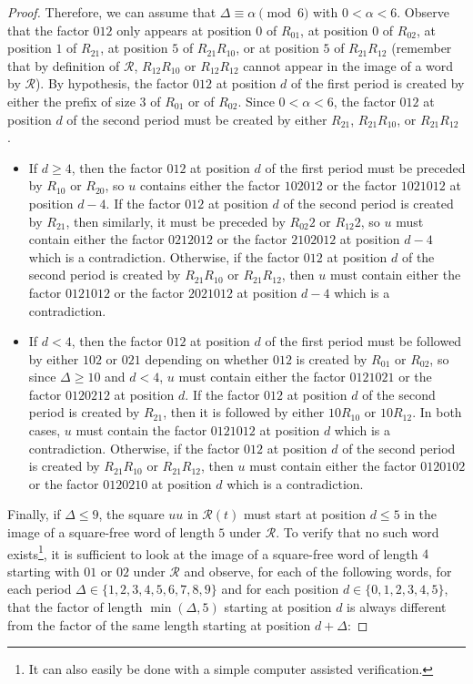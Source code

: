 \documentclass[10pt,a4paper]{amsart}
\begin{document}
\begin{proof}
    Therefore, we can assume that $\Delta \equiv \alpha\pmod6$ with $0 < \alpha < 6$. 
    Observe that the factor $012$ only appears at position $0$ of $R_{01}$, at position $0$ of $R_{02}$, at position $1$ of $R_{21}$, at position $5$ of $R_{21}R_{10}$, or at position $5$ of $R_{21}R_{12}$ (remember that by definition of $\mathcal{R}$, $R_{12}R_{10}$ or $R_{12}R_{12}$ cannot appear in the image of a word by $\mathcal{R}$). By hypothesis, the factor $012$ at position $d$ of the first period is created by either the prefix of size $3$ of $R_{01}$ or of $R_{02}$. Since $0 < \alpha < 6$, the factor $012$ at position $d$ of the second period must be created by either $R_{21}$, $R_{21}R_{10}$, or $R_{21}R_{12}$ . 
    \begin{itemize}
        \item If $d \geq 4$, then the factor $012$ at position $d$ of the first period must be preceded by $R_{10}$ or $R_{20}$, so $u$ contains either the factor $102012$ or the factor $1021012$ at position $d - 4$. If the factor $012$ at position $d$ of the second period is created by $R_{21}$, then similarly, it must be preceded by $R_{02}2$ or $R_{12}2$, so $u$ must contain either the factor $0212012$ or the factor $2102012$ at position $d - 4$ which is a contradiction. Otherwise, if the factor $012$ at position $d$ of the second period is created by $R_{21}R_{10}$ or $R_{21}R_{12}$, then $u$ must contain either the factor $0121012$ or the factor $2021012$ at position $d - 4$ which is a contradiction.
        \item If $d < 4$, then the factor $012$ at position $d$ of the first period must be followed by either $102$ or $021$ depending on whether $012$ is created by $R_{01}$ or $R_{02}$, so since $\Delta \geq 10$ and $d < 4$, $u$ must contain either the factor $0121021$ or the factor $0120212$ at position $d$. If the factor $012$ at position $d$ of the second period is created by $R_{21}$, then it is followed by either $10R_{10}$ or $10R_{12}$. In both cases, $u$ must contain the factor $0121012$ at position $d$ which is a contradiction. Otherwise, if the factor $012$ at position $d$ of the second period is created by $R_{21}R_{10}$ or $R_{21}R_{12}$, then $u$ must contain either the factor $0120102$ or the factor $0120210$ at position $d$ which is a contradiction.
    \end{itemize}
    Finally, if $\Delta \leq 9$, the square $uu$ in $\mathcal{R}(t)$ must start at position $d \leq 5$ in the image of a square-free word of length $5$ under $\mathcal{R}$. To verify that no such word exists\footnote{It can also easily be done with a simple computer assisted verification.}, it is sufficient to look at the image of a square-free word of length $4$ starting with $01$ or $02$ under $\mathcal{R}$ and observe, for each of the following words, for each period $\Delta \in \{1, 2, 3, 4, 5, 6, 7, 8, 9\}$ and for each position $d \in \{0, 1, 2, 3, 4, 5\}$, that the factor of length $\min(\Delta, 5)$ starting at position $d$ is always different from the factor of the same length starting at position $d + \Delta$:

\end{proof}
\end{document}
